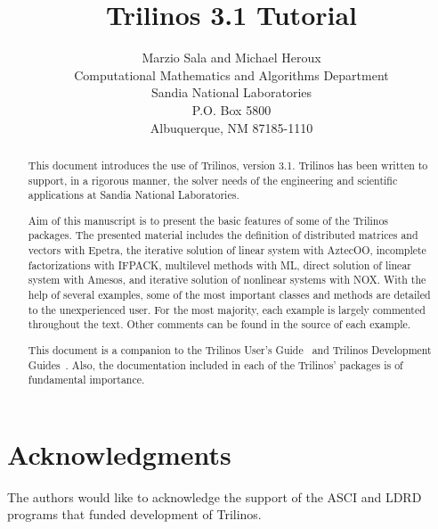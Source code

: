 \documentclass[12pt,relax]{SANDreport}
\author{Marzio Sala and Michael Heroux \\
Computational Mathematics and Algorithms Department \\
Sandia National Laboratories \\
P.O. Box 5800 \\
Albuquerque, NM 87185-1110
}
\title{Trilinos 3.1 Tutorial}
\newcommand{\Trilinos}{Trilinos}
\begin{document}
\maketitle

\begin{abstract}
  
  This document introduces the use of \Trilinos{}, version 3.1.
  \Trilinos{} has been written to support, in a rigorous manner, the
  solver needs of the engineering and scientific applications at Sandia
  National Laboratories.

  \medskip
  
  Aim of this manuscript is to present the basic features of some of the
  Trilinos packages. The presented material includes the definition of
  distributed matrices and vectors with Epetra, the iterative solution
  of linear system with AztecOO, incomplete factorizations with IFPACK,
  multilevel methods with ML, direct solution of linear system with
  Amesos, and iterative solution of nonlinear systems with NOX. With the
  help of several examples, some of the most important classes and
  methods are detailed to the unexperienced user.  For the most
  majority, each example is largely commented throughout the text. Other
  comments can be found in the source of each example.

  \medskip
  
  This document is a companion to the Trilinos User's
  Guide~\cite{Trilinos-Users-Guide} and Trilinos Development
  Guides~\cite{Trilinos-Dev-Guide,Trilinos-Dev-Guide-II}. Also, the
  documentation included in each of the Trilinos' packages is of
  fundamental importance.
 
\end{abstract}

\clearpage
\section*{Acknowledgments}
The authors would like to acknowledge the support of the ASCI and LDRD programs
that funded development of Trilinos.

\clearpage

\SANDmain

\tableofcontents

\clearpage

























\end{document}
